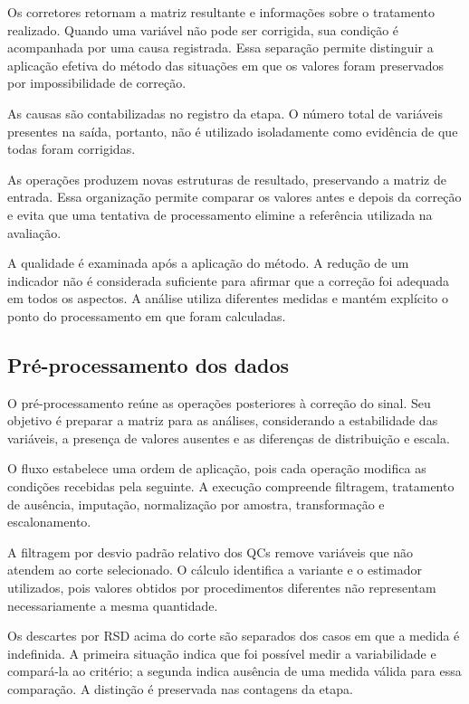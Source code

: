 Os corretores retornam a matriz resultante e informações sobre o tratamento realizado. Quando uma variável não pode ser corrigida, sua condição é acompanhada por uma causa registrada. Essa separação permite distinguir a aplicação efetiva do método das situações em que os valores foram preservados por impossibilidade de correção.

As causas são contabilizadas no registro da etapa. O número total de variáveis presentes na saída, portanto, não é utilizado isoladamente como evidência de que todas foram corrigidas.

As operações produzem novas estruturas de resultado, preservando a matriz de entrada. Essa organização permite comparar os valores antes e depois da correção e evita que uma tentativa de processamento elimine a referência utilizada na avaliação.

A qualidade é examinada após a aplicação do método. A redução de um indicador não é considerada suficiente para afirmar que a correção foi adequada em todos os aspectos. A análise utiliza diferentes medidas e mantém explícito o ponto do processamento em que foram calculadas.

\subsection{Pré-processamento dos dados}
\label{subsec:pre-processamento-dados}

O pré-processamento reúne as operações posteriores à correção do sinal. Seu objetivo é preparar a matriz para as análises, considerando a estabilidade das variáveis, a presença de valores ausentes e as diferenças de distribuição e escala.

O fluxo estabelece uma ordem de aplicação, pois cada operação modifica as condições recebidas pela seguinte. A execução compreende filtragem, tratamento de ausência, imputação, normalização por amostra, transformação e escalonamento.

A filtragem por desvio padrão relativo dos QCs remove variáveis que não atendem ao corte selecionado. O cálculo identifica a variante e o estimador utilizados, pois valores obtidos por procedimentos diferentes não representam necessariamente a mesma quantidade.

Os descartes por RSD acima do corte são separados dos casos em que a medida é indefinida. A primeira situação indica que foi possível medir a variabilidade e compará-la ao critério; a segunda indica ausência de uma medida válida para essa comparação. A distinção é preservada nas contagens da etapa.

